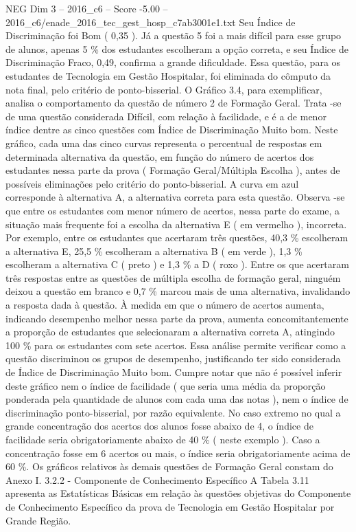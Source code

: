 \begin{textsample}{NEG Dim 3 – 2016\_c6 – Score -5.00 – 2016\_c6/enade\_2016\_tec\_gest\_hosp\_c7ab3001e1.txt}
Seu Índice de Discriminação foi Bom ( 0,35 ).
Já a questão 5 foi a mais difícil para esse grupo de alunos, apenas 5 \% dos estudantes escolheram a opção correta, e seu Índice de Discriminação Fraco, 0,49, confirma a grande dificuldade.
Essa questão, para os estudantes de Tecnologia em Gestão Hospitalar, foi eliminada do cômputo da nota final, pelo critério de ponto-bisserial.
O Gráfico 3.4, para exemplificar, analisa o comportamento da questão de número 2 de Formação Geral.
Trata -se de uma questão considerada Difícil, com relação à facilidade, e é a de menor índice dentre as cinco questões com Índice de Discriminação Muito bom.
Neste gráfico, cada uma das cinco curvas representa o percentual de respostas em determinada alternativa da questão, em função do número de acertos dos estudantes nessa parte da prova ( Formação Geral/Múltipla Escolha ), antes de possíveis eliminações pelo critério do ponto-bisserial.
A curva em azul corresponde à alternativa A, a alternativa correta para esta questão.
Observa -se que entre os estudantes com menor número de acertos, nessa parte do exame, a situação mais frequente foi a escolha da alternativa E ( em vermelho ), incorreta.
Por exemplo, entre os estudantes que acertaram três questões, 40,3 \% escolheram a alternativa E, 25,5 \% escolheram a alternativa B ( em verde ), 1,3 \% escolheram a alternativa C ( preto ) e 1,3 \% a D ( roxo ).
Entre os que acertaram três respostas entre as questões de múltipla escolha de formação geral, ninguém deixou a questão em branco e 0,7 \% marcou mais de uma alternativa, invalidando a resposta dada à questão.
À medida em que o número de acertos aumenta, indicando desempenho melhor nessa parte da prova, aumenta concomitantemente a proporção de estudantes que selecionaram a alternativa correta A, atingindo 100 \% para os estudantes com sete acertos.
Essa análise permite verificar como a questão discriminou os grupos de desempenho, justificando ter sido considerada de Índice de Discriminação Muito bom.
Cumpre notar que não é possível inferir deste gráfico nem o índice de facilidade ( que seria uma média da proporção ponderada pela quantidade de alunos com cada uma das notas ), nem o índice de discriminação ponto-bisserial, por razão equivalente.
No caso extremo no qual a grande concentração dos acertos dos alunos fosse abaixo de 4, o índice de facilidade seria obrigatoriamente abaixo de 40 \% ( neste exemplo ).
Caso a concentração fosse em 6 acertos ou mais, o índice seria obrigatoriamente acima de 60 \%.
Os gráficos relativos às demais questões de Formação Geral constam do Anexo I. 3.2.2 - Componente de Conhecimento Específico A Tabela 3.11 apresenta as Estatísticas Básicas em relação às questões objetivas do Componente de Conhecimento Específico da prova de Tecnologia em Gestão Hospitalar por Grande Região.

\end{textsample}
